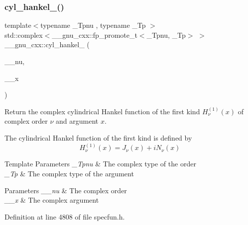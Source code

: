 \subsubsection{\texorpdfstring{cyl\+\_\+hankel\+\_()}{cyl\_hankel\_1()}\hspace{0.1cm}{\footnotesize\ttfamily [2/2]}}
{\footnotesize\ttfamily template$<$typename \+\_\+\+Tpnu , typename \+\_\+\+Tp $>$ \\
std\+::complex$<$\+\_\+\+\_\+gnu\+\_\+cxx\+::fp\+\_\+promote\+\_\+t$<$\+\_\+\+Tpnu, \+\_\+\+Tp$>$ $>$ \+\_\+\+\_\+gnu\+\_\+cxx\+::cyl\+\_\+hankel\+\_ (\begin{DoxyParamCaption}\item[{std\+::complex$<$ \+\_\+\+Tpnu $>$}]{\+\_\+\+\_\+nu,  }\item[{std\+::complex$<$ \+\_\+\+Tp $>$}]{\+\_\+\+\_\+x }\end{DoxyParamCaption})\hspace{0.3cm}{\ttfamily [inline]}}

Return the complex cylindrical Hankel function of the first kind $ H^{(1)}_\nu(x) $ of complex order $ \nu $ and argument $ x $.

The cylindrical Hankel function of the first kind is defined by \[ H^{(1)}_\nu(x) = J_\nu(x) + i N_\nu(x) \]


\begin{DoxyTemplParams}{Template Parameters}
{\em \+\_\+\+Tpnu} & The complex type of the order \\
\hline
{\em \+\_\+\+Tp} & The complex type of the argument \\
\hline
\end{DoxyTemplParams}

\begin{DoxyParams}{Parameters}
{\em \+\_\+\+\_\+nu} & The complex order \\
\hline
{\em \+\_\+\+\_\+x} & The complex argument \\
\hline
\end{DoxyParams}


Definition at line 4808 of file specfun.\+h.

\mbox{\label{group__gnu__math__spec__func_ga89758ed03e56567baa62b90cc4784f71}} 
